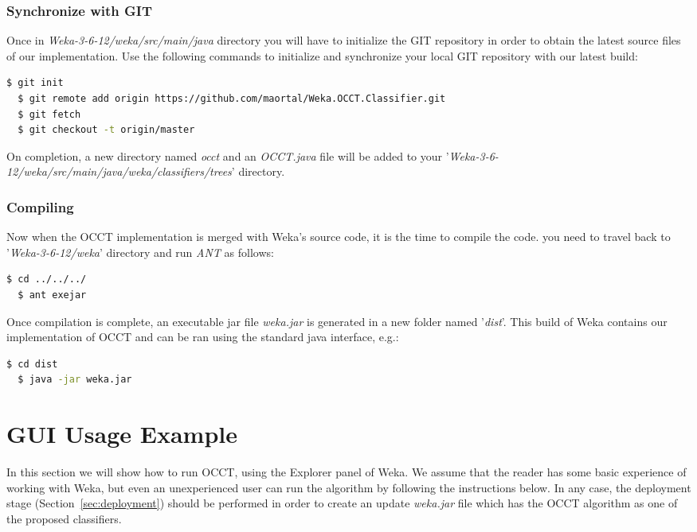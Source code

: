 \documentclass[a4paper,12pt]{article}
\newcommand{\newpar}{\smallskip\noindent} %
\begin{document}
\begin{spacing}{1.5}
\subsubsection{Synchronize with GIT}
Once in {\em Weka-3-6-12/weka/src/main/java} directory you will have to initialize the GIT repository in order to obtain the latest source files of our implementation.
Use the following commands to initialize and synchronize your local GIT repository with our latest build:
\begin{lstlisting}[language=bash,frame=none,backgroundcolor=\color{anti-flashwhite}]
  $ git init
  $ git remote add origin https://github.com/maortal/Weka.OCCT.Classifier.git
  $ git fetch
  $ git checkout -t origin/master
\end{lstlisting}
\newpar
On completion, a new directory named {\em occt} and an {\em OCCT.java} file will be added to your '{\em Weka-3-6-12/weka/src/main/java/weka/classifiers/trees}' directory.

\subsubsection{Compiling}
Now when the OCCT implementation is merged with Weka's source code, it is the time to compile the code. you need to travel back to '{\em Weka-3-6-12/weka}' directory and run {\em ANT} as follows:
\begin{lstlisting}[language=bash,frame=none,backgroundcolor=\color{anti-flashwhite}]
  $ cd ../../../
  $ ant exejar
\end{lstlisting}
Once compilation is complete, an executable jar file {\em weka.jar} is generated in a new folder named '{\em dist}'. This build of Weka contains our implementation of OCCT and can be ran using the standard java interface, e.g.:
\begin{lstlisting}[language=bash,frame=none,backgroundcolor=\color{anti-flashwhite}]
  $ cd dist
  $ java -jar weka.jar
\end{lstlisting}

\clearpage
\section{GUI Usage Example}
In this section we will show how to run OCCT, using the Explorer panel of Weka. We assume that the reader has some basic experience of working with Weka, but even an unexperienced user can run the algorithm by following the instructions below. In any case, the deployment stage (Section~\ref{sec:deployment}) should be performed in order to create an update {\em weka.jar} file which has the OCCT algorithm as one of the proposed classifiers.


\end{spacing}
\end{document}
